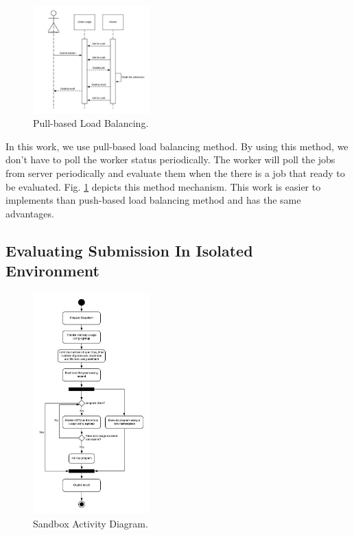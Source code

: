 \documentclass[conference]{IEEEtran}
\begin{document}
\begin{figure}[htbp]
\centerline{\includegraphics[width=0.4\textwidth]{images/paper-pull-based-load-balancing.jpeg}}
\caption{Pull-based Load Balancing.}
\label{pull-based-load-balancing}
\end{figure}

In this work, we use pull-based load balancing method. By using this method, we don't have to poll the worker status periodically. The worker will poll the jobs from server periodically and evaluate them when the there is a job that ready to be evaluated. Fig. \ref{pull-based-load-balancing} depicts this method mechanism. This work is easier to implements than push-based load balancing method and has the same advantages.

\subsection{Evaluating Submission In Isolated Environment}

\begin{figure}[htbp]
\centerline{\includegraphics[width=0.4\textwidth]{images/paper-sandbox-activity.jpeg}}
\caption{Sandbox Activity Diagram.}
\label{paper-sandbox-activity}
\end{figure}
\end{document}
